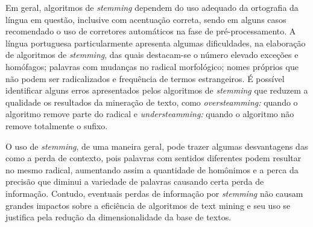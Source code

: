 Em geral, algoritmos de \textit{stemming} dependem do uso adequado da ortografia da língua em questão, inclusive com acentuação correta, sendo em alguns casos recomendado o uso de corretores automáticos na fase de pré-processamento. A língua portuguesa particularmente apresenta algumas dificuldades, na elaboração de algoritmos de \textit{stemming}, das quais destacam-se o número elevado exceções e homófagos; palavras com mudanças no radical morfológico; nomes próprios que não podem ser radicalizados e frequência de termos estrangeiros.  É possível identificar alguns erros apresentados pelos algoritmos de \textit{stemming} que reduzem a qualidade os resultados da mineração de texto, como \textit{oversteamming:} quando o algoritmo remove parte do radical e \textit{understeamming:} quando o algoritmo não remove totalmente o sufixo.

O uso de \textit{stemming}, de uma maneira geral, pode trazer algumas desvantagens das como a perda de contexto, pois palavras com sentidos diferentes podem resultar no mesmo radical, aumentando assim a quantidade de homônimos e a perca da precisão que diminui a variedade de palavras causando certa perda de informação. Contudo, eventuais perdas de informação por \textit{stemming} não causam grandes impactos sobre a eficiência de algoritmos de text mining e seu uso se justifica pela redução da dimensionalidade da base de textos.



